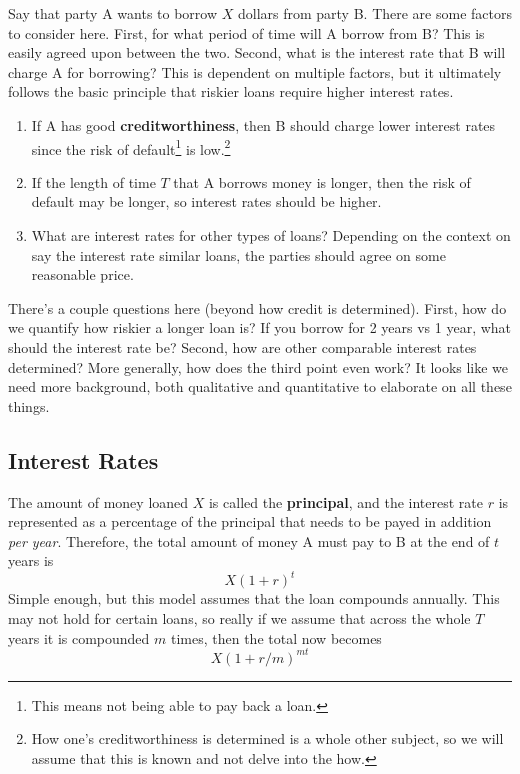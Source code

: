 \documentclass{article}
\begin{document}
    Say that party A wants to borrow $X$ dollars from party B. There are some factors to consider here. First, for what period of time will A borrow from B? This is easily agreed upon between the two. Second, what is the interest rate that B will charge A for borrowing? This is dependent on multiple factors, but it ultimately follows the basic principle that riskier loans require higher interest rates. 
    \begin{enumerate}
      \item If A has good \textbf{creditworthiness}, then B should charge lower interest rates since the risk of default\footnote{This means not being able to pay back a loan.} is low.\footnote{How one's creditworthiness is determined is a whole other subject, so we will assume that this is known and not delve into the how. }
      \item If the length of time $T$ that A borrows money is longer, then the risk of default may be longer, so interest rates should be higher. 
      \item What are interest rates for other types of loans? Depending on the context on say the interest rate similar loans, the parties should agree on some reasonable price.  
    \end{enumerate} 
    There's a couple questions here (beyond how credit is determined). First, how do we quantify how riskier a longer loan is? If you borrow for 2 years vs 1 year, what should the interest rate be? Second, how are other comparable interest rates determined? More generally, how does the third point even work? It looks like we need more background, both qualitative and quantitative to elaborate on all these things. 

  \subsection{Interest Rates} 

    The amount of money loaned $X$ is called the \textbf{principal}, and the interest rate $r$ is represented as a percentage of the principal that needs to be payed in addition \textit{per year}. Therefore, the total amount of money A must pay to B at the end of $t$ years is 
    \begin{equation}
      X (1 + r)^t
    \end{equation} 
    Simple enough, but this model assumes that the loan compounds annually. This may not hold for certain loans, so really if we assume that across the whole $T$ years it is compounded $m$ times, then the total now becomes 
    \begin{equation}
      X (1 + r/m)^{mt}
    \end{equation}
\end{document}
